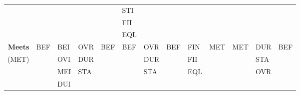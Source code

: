 \documentclass[11pt]{report}
\newenvironment{vvarmargin}[2]
{
  \begin{list}{}
  {
    \setlength{\topsep}{0pt}
    \setlength{\leftmargin}{0pt}
    \setlength{\rightmargin}{0pt}
    \setlength{\listparindent}{\parindent}
    \setlength{\itemindent}{\parindent}
    \setlength{\parsep}{0pt plus 1pt}
    \addtolength{\leftmargin}{#1}\addtolength{\rightmargin}{#2}
  }
  \item
}
{
  \end{list}
}
\begin{document}
\begin{table}[p]
\begin{vvarmargin}{-4cm}{-4cm}
\begin{center}
\begin{tabular}[t]{|r|l|l|l|l|l|l|l|l|l|l|l|l|}
                                          &                         &                         &                         &                         & STI                     &                         &                         &                         &                         &                         &                         &                         \\
                                          &                         &                         &                         &                         & FII                     &                         &                         &                         &                         &                         &                         &                         \\
                                          &                         &                         &                         &                         & EQL                     &                         &                         &                         &                         &                         &                         &                         \\
                  \hline
                  \textbf{Meets}          & BEF                     & BEI                     & OVR                     & BEF                     & BEF                     & OVR                     & BEF                     & FIN                     & MET                     & MET                     & DUR                     & BEF                     \\
                  (MET)                   &                         & OVI                     & DUR                     &                         &                         & DUR                     &                         & FII                     &                         &                         & STA                     &                         \\
                                          &                         & MEI                     & STA                     &                         &                         & STA                     &                         & EQL                     &                         &                         & OVR                     &                         \\
                                          &                         & DUI                     &                         &                         &                         &                         &                         &                         &                         &                         &                         &                         \\

\end{tabular}
\end{center}
\end{vvarmargin}
\end{table}
\end{document}
